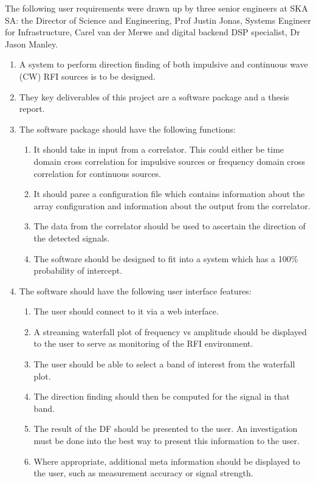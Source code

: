 The following user requirements were drawn up by three senior engineers at SKA SA: the Director of Science and Engineering, Prof Justin Jonas, Systems Engineer for Infrastructure, Carel van der Merwe and digital backend DSP specialist, Dr Jason Manley. 

\begin{enumerate}
  \item A system to perform direction finding of both impulsive and continuous wave (CW) RFI sources is to be designed.
  \item They key deliverables of this project are a software package and a thesis report.
  \item The software package should have the following functions:
    \begin{enumerate}
      \item It should take in input from a correlator. This could either be time domain cross correlation for impulsive sources or frequency domain cross correlation for continuous sources. 
      \item It should parse a configuration file which contains information about the array configuration and information about the output from the correlator.
      \item The data from the correlator should be used to ascertain the direction of the detected signals.
      \item The software should be designed to fit into a system which has a 100\% probability of intercept. 
    \end{enumerate}
  \item The software should have the following user interface features:
    \begin{enumerate}
      \item The user should connect to it via a web interface.
      \item A streaming waterfall plot of frequency vs amplitude should be displayed to the user to serve as monitoring of the RFI environment.
      \item The user should be able to select a band of interest from the waterfall plot.
      \item The direction finding should then be computed for the signal in that band.
      \item The result of the DF should be presented to the user. An investigation must be done into the best way to present this information to the user.
      \item Where appropriate, additional meta information should be displayed to the user, such as measurement accuracy or signal strength.

\end{enumerate}
\end{enumerate}
